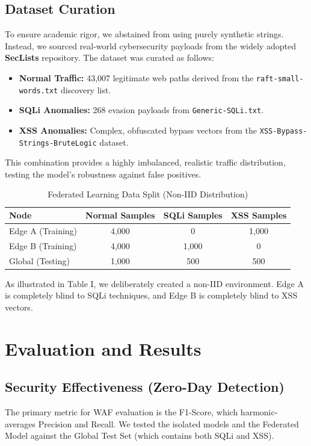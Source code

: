 \documentclass[conference]{IEEEtran}
\begin{document}
\subsection{Dataset Curation}
To ensure academic rigor, we abstained from using purely synthetic strings. Instead, we sourced real-world cybersecurity payloads from the widely adopted \textbf{SecLists} repository. 
The dataset was curated as follows:
\begin{itemize}
    \item \textbf{Normal Traffic:} 43,007 legitimate web paths derived from the \texttt{raft-small-words.txt} discovery list.
    \item \textbf{SQLi Anomalies:} 268 evasion payloads from \texttt{Generic-SQLi.txt}.
    \item \textbf{XSS Anomalies:} Complex, obfuscated bypass vectors from the \texttt{XSS-Bypass-Strings-BruteLogic} dataset.
\end{itemize}
This combination provides a highly imbalanced, realistic traffic distribution, testing the model's robustness against false positives.

\begin{table}[htbp]
\centering
\caption{Federated Learning Data Split (Non-IID Distribution)}
\begin{tabular}{@{}lccc@{}}
\toprule
\textbf{Node} & \textbf{Normal Samples} & \textbf{SQLi Samples} & \textbf{XSS Samples} \\ \midrule
Edge A (Training)      & 4,000                   & 0                     & 1,000                \\
Edge B (Training)      & 4,000                   & 1,000                 & 0                    \\
Global (Testing)       & 1,000                   & 500                   & 500                  \\ \bottomrule
\end{tabular}
\end{table}

As illustrated in Table I, we deliberately created a non-IID environment. Edge A is completely blind to SQLi techniques, and Edge B is completely blind to XSS vectors.

\section{Evaluation and Results}

\subsection{Security Effectiveness (Zero-Day Detection)}
The primary metric for WAF evaluation is the F1-Score, which harmonic-averages Precision and Recall. We tested the isolated models and the Federated Model against the Global Test Set (which contains both SQLi and XSS).
\end{document}
